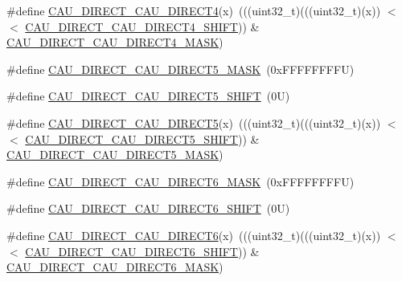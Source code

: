 \begin{DoxyCompactItemize}
\item 
\#define \mbox{\hyperlink{group___c_a_u___register___masks_gaf17ec77a232bb8d8322c995e1e4808a8}{C\+A\+U\+\_\+\+D\+I\+R\+E\+C\+T\+\_\+\+C\+A\+U\+\_\+\+D\+I\+R\+E\+C\+T4}}(x)~(((uint32\+\_\+t)(((uint32\+\_\+t)(x)) $<$$<$ \mbox{\hyperlink{group___c_a_u___register___masks_ga14860fd31f4e7f9792da121883d992d9}{C\+A\+U\+\_\+\+D\+I\+R\+E\+C\+T\+\_\+\+C\+A\+U\+\_\+\+D\+I\+R\+E\+C\+T4\+\_\+\+S\+H\+I\+FT}})) \& \mbox{\hyperlink{group___c_a_u___register___masks_gae8d866b4ec3bf7cad4a7983517e615b7}{C\+A\+U\+\_\+\+D\+I\+R\+E\+C\+T\+\_\+\+C\+A\+U\+\_\+\+D\+I\+R\+E\+C\+T4\+\_\+\+M\+A\+SK}})
\item 
\#define \mbox{\hyperlink{group___c_a_u___register___masks_gaa8212c898d5d71af9b7003bcc5c68a58}{C\+A\+U\+\_\+\+D\+I\+R\+E\+C\+T\+\_\+\+C\+A\+U\+\_\+\+D\+I\+R\+E\+C\+T5\+\_\+\+M\+A\+SK}}~(0x\+F\+F\+F\+F\+F\+F\+F\+F\+U)
\item 
\#define \mbox{\hyperlink{group___c_a_u___register___masks_ga7f59928c2b946e1d249aa9b3b3fdd537}{C\+A\+U\+\_\+\+D\+I\+R\+E\+C\+T\+\_\+\+C\+A\+U\+\_\+\+D\+I\+R\+E\+C\+T5\+\_\+\+S\+H\+I\+FT}}~(0\+U)
\item 
\#define \mbox{\hyperlink{group___c_a_u___register___masks_ga1f7ce76ab2e7c9239af0b250337e1055}{C\+A\+U\+\_\+\+D\+I\+R\+E\+C\+T\+\_\+\+C\+A\+U\+\_\+\+D\+I\+R\+E\+C\+T5}}(x)~(((uint32\+\_\+t)(((uint32\+\_\+t)(x)) $<$$<$ \mbox{\hyperlink{group___c_a_u___register___masks_ga7f59928c2b946e1d249aa9b3b3fdd537}{C\+A\+U\+\_\+\+D\+I\+R\+E\+C\+T\+\_\+\+C\+A\+U\+\_\+\+D\+I\+R\+E\+C\+T5\+\_\+\+S\+H\+I\+FT}})) \& \mbox{\hyperlink{group___c_a_u___register___masks_gaa8212c898d5d71af9b7003bcc5c68a58}{C\+A\+U\+\_\+\+D\+I\+R\+E\+C\+T\+\_\+\+C\+A\+U\+\_\+\+D\+I\+R\+E\+C\+T5\+\_\+\+M\+A\+SK}})
\item 
\#define \mbox{\hyperlink{group___c_a_u___register___masks_ga971c00d2038809c2c31c18f8942807ec}{C\+A\+U\+\_\+\+D\+I\+R\+E\+C\+T\+\_\+\+C\+A\+U\+\_\+\+D\+I\+R\+E\+C\+T6\+\_\+\+M\+A\+SK}}~(0x\+F\+F\+F\+F\+F\+F\+F\+F\+U)
\item 
\#define \mbox{\hyperlink{group___c_a_u___register___masks_ga4dea5b62b401604587b9fa6ed0d98f65}{C\+A\+U\+\_\+\+D\+I\+R\+E\+C\+T\+\_\+\+C\+A\+U\+\_\+\+D\+I\+R\+E\+C\+T6\+\_\+\+S\+H\+I\+FT}}~(0\+U)
\item 
\#define \mbox{\hyperlink{group___c_a_u___register___masks_gafd7a2e3e43805f32a2af9474502113b6}{C\+A\+U\+\_\+\+D\+I\+R\+E\+C\+T\+\_\+\+C\+A\+U\+\_\+\+D\+I\+R\+E\+C\+T6}}(x)~(((uint32\+\_\+t)(((uint32\+\_\+t)(x)) $<$$<$ \mbox{\hyperlink{group___c_a_u___register___masks_ga4dea5b62b401604587b9fa6ed0d98f65}{C\+A\+U\+\_\+\+D\+I\+R\+E\+C\+T\+\_\+\+C\+A\+U\+\_\+\+D\+I\+R\+E\+C\+T6\+\_\+\+S\+H\+I\+FT}})) \& \mbox{\hyperlink{group___c_a_u___register___masks_ga971c00d2038809c2c31c18f8942807ec}{C\+A\+U\+\_\+\+D\+I\+R\+E\+C\+T\+\_\+\+C\+A\+U\+\_\+\+D\+I\+R\+E\+C\+T6\+\_\+\+M\+A\+SK}})
$$
\end{DoxyCompactItemize}
